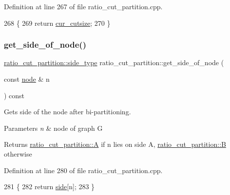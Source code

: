 Definition at line 267 of file ratio\+\_\+cut\+\_\+partition.\+cpp.


\begin{DoxyCode}
268 \{
269     \textcolor{keywordflow}{return} \mbox{\hyperlink{classratio__cut__partition_aa01f2d6257fff28739e2431fe826ef71}{cur\_cutsize}};
270 \}
\end{DoxyCode}
\mbox{\label{classratio__cut__partition_a3b0a7dcc26c9ca25016abf2cebf250fe}} 
\subsubsection{\texorpdfstring{get\+\_\+side\+\_\+of\+\_\+node()}{get\_side\_of\_node()}}
{\footnotesize\ttfamily \mbox{\hyperlink{classratio__cut__partition_ace53442bd0c1e21fbf00858ec6f6b456}{ratio\+\_\+cut\+\_\+partition\+::side\+\_\+type}} ratio\+\_\+cut\+\_\+partition\+::get\+\_\+side\+\_\+of\+\_\+node (\begin{DoxyParamCaption}\item[{const \mbox{\hyperlink{classnode}{node}} \&}]{n }\end{DoxyParamCaption}) const}

Gets side of the node after bi-\/partitioning.


\begin{DoxyParams}{Parameters}
{\em n} & node of graph G \\
\hline
\end{DoxyParams}
\begin{DoxyReturn}{Returns}
{\ttfamily \mbox{\hyperlink{classratio__cut__partition_a9c0da5ad845b01bddbc1f238fa35cdd0}{ratio\+\_\+cut\+\_\+partition\+::A}}} if {\ttfamily n} lies on side {\ttfamily A}, {\ttfamily \mbox{\hyperlink{classratio__cut__partition_adf075987228d8adc7950d5b1ba332daa}{ratio\+\_\+cut\+\_\+partition\+::B}}} otherwise 
\end{DoxyReturn}


Definition at line 280 of file ratio\+\_\+cut\+\_\+partition.\+cpp.


\begin{DoxyCode}
281 \{
282     \textcolor{keywordflow}{return} \mbox{\hyperlink{classratio__cut__partition_a2bf913d1d8607747885177a3b585e611}{side}}[n];
283 \}
\end{DoxyCode}
\mbox{\label{classratio__cut__partition_af68528cd0b199718e6b2f5fe8182e779}} 
